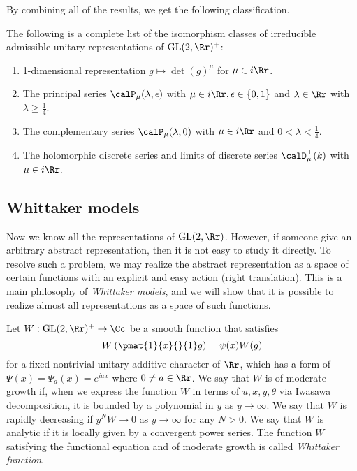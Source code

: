 By combining all of the results, we get the following classification. 

\begin{theorem}
The following is a complete list of the isomorphism classes of irreducible admissible unitary representations of $\GL(2, \Rr)^{+}$:
\begin{enumerate}
\item 1-dimensional representation $g\mapsto \det(g)^{\mu}$ for $\mu\in i\Rr$. 
\item The principal series $\calP_{\mu}(\lambda, \epsilon)$ with $\mu\in i\Rr, \epsilon \in \{0, 1\}$ and $\lambda\in \Rr$ with $\lambda \geq \frac{1}{4}$. 
\item The complementary series $\calP_{\mu}(\lambda, 0)$ with $\mu\in i\Rr$ and $0<\lambda <\frac{1}{4}$. 
\item The holomorphic discrete series and limits of discrete series $\calD_{\mu}^{\pm}(k)$ with $\mu\in i\Rr$. 
\end{enumerate}
\end{theorem}


\subsection{Whittaker models}
Now we know all the representations of $\GL(2, \Rr)$. However, if someone give an arbitrary abstract representation, then it is not easy to study it directly. To resolve such a problem, we may realize the abstract representation as a space of certain functions with an explicit and easy action (right translation). 
This is a main philosophy of \emph{Whittaker models}, and we will show that it is possible to realize almost all representations as a space of such functions. 

Let $W:\GL(2, \Rr)^{+}\to \Cc$ be a smooth function that satisfies 
$$
W\left(\pmat{1}{x}{}{1}g \right) = \psi(x) W(g)
$$
for a fixed nontrivial unitary additive character of $\Rr$, which has a form of $\Psi(x) = \Psi_{a}(x) = e^{iax}$ where  $0\neq a\in\Rr$. We say that $W$ is of moderate growth if, when we express the function $W$ in terms of $u, x, y, \theta$ via Iwasawa decomposition, it is bounded by a polynomial in $y$ as $y\to \infty$. We say that $W$ is rapidly decreasing if $y^{N}W\to 0$ as $y\to \infty$ for any $N>0$. We say that $W$ is analytic if it is locally given by a convergent power series. 
The function $W$ satisfying the functional equation and of moderate growth is called \emph{Whittaker function}.


